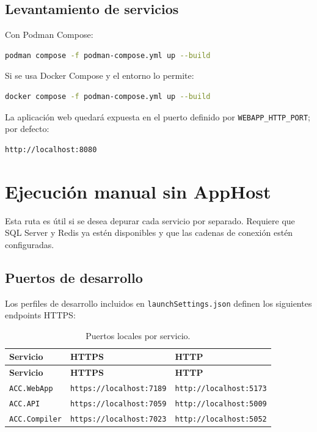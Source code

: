 \documentclass[12pt,letterpaper]{article}
\begin{document}
\subsection{Levantamiento de servicios}

Con Podman Compose:

\begin{lstlisting}[language=bash,caption={Ejecuci\'on con Podman Compose.}]
podman compose -f podman-compose.yml up --build
\end{lstlisting}

Si se usa Docker Compose y el entorno lo permite:

\begin{lstlisting}[language=bash,caption={Ejecuci\'on con Docker Compose.}]
docker compose -f podman-compose.yml up --build
\end{lstlisting}

La aplicaci\'on web quedar\'a expuesta en el puerto definido por \texttt{WEBAPP\_HTTP\_PORT}; por defecto:

\begin{lstlisting}[caption={URL por defecto en contenedores.}]
http://localhost:8080
\end{lstlisting}

\section{Ejecuci\'on manual sin AppHost}

Esta ruta es \'util si se desea depurar cada servicio por separado. Requiere que SQL Server y Redis ya est\'en disponibles y que las cadenas de conexi\'on est\'en configuradas.

\subsection{Puertos de desarrollo}

Los perfiles de desarrollo incluidos en \texttt{launchSettings.json} definen los siguientes endpoints HTTPS:

\begin{longtable}{p{}p{}p{}}
\caption{Puertos locales por servicio.}
\label{tab:puertos}\\
\toprule
\textbf{Servicio} & \textbf{HTTPS} & \textbf{HTTP} \\
\midrule
\endfirsthead
\toprule
\textbf{Servicio} & \textbf{HTTPS} & \textbf{HTTP} \\
\midrule
\endhead
\texttt{ACC.WebApp} & \texttt{https://localhost:7189} & \texttt{http://localhost:5173} \\
\texttt{ACC.API} & \texttt{https://localhost:7059} & \texttt{http://localhost:5009} \\
\texttt{ACC.Compiler} & \texttt{https://localhost:7023} & \texttt{http://localhost:5052} \\
\bottomrule
\end{longtable}
\end{document}
